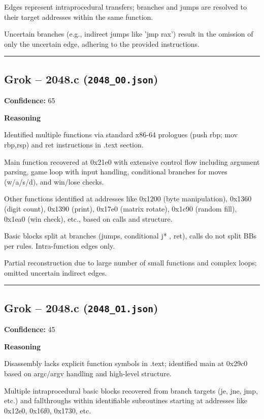 Edges represent intraprocedural transfers; branches and jumps are resolved to their target addresses within the same function.

Uncertain branches (e.g., indirect jumps like 'jmp rax') result in the omission of only the uncertain edge, adhering to the provided instructions.

\bigskip
\hrule
\bigskip

\subsection{Grok -- 2048.c (\texttt{2048\_O0.json})}

\textbf{Confidence:} 65

\textbf{Reasoning}

Identified multiple functions via standard x86-64 prologues (push rbp; mov rbp,rsp) and ret instructions in .text section.

Main function recovered at 0x21e0 with extensive control flow including argument parsing, game loop with input handling, conditional branches for moves (w/a/s/d), and win/lose checks.

Other functions identified at addresses like 0x1200 (byte manipulation), 0x1360 (digit count), 0x1390 (print), 0x17e0 (matrix rotate), 0x1c90 (random fill), 0x1ea0 (win check), etc., based on calls and structure.

Basic blocks split at branches (jumps, conditional j* , ret), calls do not split BBs per rules. Intra-function edges only.

Partial reconstruction due to large number of small functions and complex loops; omitted uncertain indirect edges.

\bigskip
\hrule
\bigskip

\subsection{Grok -- 2048.c (\texttt{2048\_O1.json})}

\textbf{Confidence:} 45

\textbf{Reasoning}

Disassembly lacks explicit function symbols in .text; identified main at 0x29c0 based on argc/argv handling and high-level structure.

Multiple intraprocedural basic blocks recovered from branch targets (je, jne, jmp, etc.) and fallthroughs within identifiable subroutines starting at addresses like 0x12e0, 0x16f0, 0x1730, etc.

